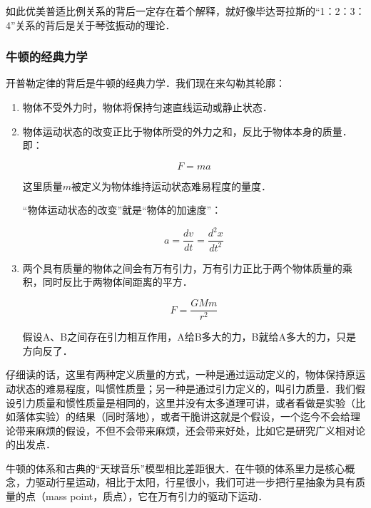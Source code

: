 如此优美普适比例关系的背后一定存在着个解释，就好像毕达哥拉斯的“1：2：3：4”关系的背后是关于琴弦振动的理论．

\subsubsection{牛顿的经典力学}

开普勒定律的背后是牛顿的经典力学．我们现在来勾勒其轮廓：

\begin{enumerate}
\item 

物体不受外力时，物体将保持匀速直线运动或静止状态．

\item

物体运动状态的改变正比于物体所受的外力之和，反比于物体本身的质量．即：

\begin{equation}
F = ma
\end{equation}

这里质量$m$被定义为物体维持运动状态难易程度的量度．

“物体运动状态的改变”就是“物体的加速度”：

\begin{equation}
a = \frac{d v}{d t} = \frac{d^2 x}{d t^2}
\end{equation}

\item

两个具有质量的物体之间会有万有引力，万有引力正比于两个物体质量的乘积，同时反比于两物体间距离的平方．

\begin{equation}
F = \frac{G M m}{r^2}
\end{equation}

假设A、B之间存在引力相互作用，A给B多大的力，B就给A多大的力，只是方向反了．

\end{enumerate}

仔细读的话，这里有两种定义质量的方式，一种是通过运动定义的，物体保持原运动状态的难易程度，叫惯性质量；另一种是通过引力定义的，叫引力质量．我们假设引力质量和惯性质量是相同的，这里并没有太多道理可讲，或者看做是实验（比如落体实验）的结果（同时落地），或者干脆讲这就是个假设，一个迄今不会给理论带来麻烦的假设，不但不会带来麻烦，还会带来好处，比如它是研究广义相对论的出发点．

牛顿的体系和古典的“天球音乐”模型相比差距很大．在牛顿的体系里力是核心概念，力驱动行星运动，相比于太阳，行星很小，我们可进一步把行星抽象为具有质量的点（mass point，质点），它在万有引力的驱动下运动．

